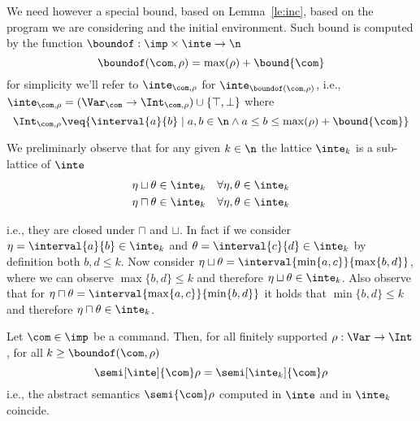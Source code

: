 We need however a special bound, based on Lemma~\ref{le:inc}, based on
the program we are considering and the initial environment. Such bound
is computed by the function \({\boundof : \imp \times \inte \to \n}\)
\begin{equation*}
  \boundof(\com, \rho) = \max(\rho) + \bound{\com}
\end{equation*}
for simplicity we'll refer to \(\inte_{\com,\rho}\) for
\(\inte_{\boundof(\com,\rho)}\), i.e.,
\({\inte_{\com,\rho} = (\Var_{\com} \to \Int_{\com,\rho}) \cup \{
  \top, \bot \}}\) where
\begin{equation*}
  \Int_{\com,\rho} \veq \{ \interval{a}{b} \mid a, b \in \n \land
  a \leq b \leq \max(\rho) + \bound{\com}\}
\end{equation*}

We preliminarly observe that for any given \(k\in\n\) the lattice
\(\inte_k\) is a sub-lattice of \(\inte\)
\begin{align*}
  \eta \sqcup \theta & \in \inte_k & \forall \eta,\theta \in \inte_k \\
  \eta \sqcap \theta & \in \inte_k & \forall \eta,\theta \in \inte_k
\end{align*}

i.e., they are closed under \(\sqcap\) and \(\sqcup\). In fact if we
consider \({\eta = \interval{a}{b} \in \inte_k}\) and
\({\theta = \interval{c}{d} \in \inte_k}\) by definition both
\(b,d \leq k\). Now consider
\({\eta \sqcup \theta = \interval{\min\{a,c\}}{\max\{b,d\}}}\), where
we can observe \(\max\{b,d\} \leq k\) and therefore
\({\eta \sqcup \theta \in \inte_k}\). Also observe that for
\({\eta \sqcap \theta = \interval{\max\{a,c\}}{\min\{b,d\}}}\) it
holds that \({\min\{b,d\} \leq k}\) and therefore
\({\eta \sqcap \theta \in \inte_k}\).


\begin{lemma}
  Let \(\com\in \imp\) be a command. Then, for all finitely supported
  \(\rho : \Var \to \Int\), for all \(k\geq \boundof(\com,\rho)\)
  \begin{equation*}
    \semi[\inte]{\com}\rho = \semi[\inte_k]{\com}\rho
  \end{equation*}
  i.e., the abstract semantics \(\semi{\com} \rho \)
  computed in \(\inte\) and in \(\inte_k\) coincide.
\end{lemma}

